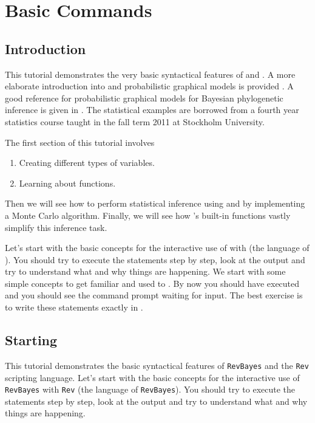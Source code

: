 \section{Basic \Rev Commands}

\subsection{Introduction}

This tutorial demonstrates the very basic syntactical features of \RevBayes and \Rev. 
A more elaborate introduction into \Rev and probabilistic graphical models is provided .
A good reference for probabilistic graphical models for Bayesian phylogenetic inference is given in \cite{Hoehna2014b}.
The statistical examples are borrowed from a fourth year statistics course taught in the fall term 2011 at Stockholm University.

The first section of this tutorial involves 
\begin{enumerate}
\item Creating different types of variables.
\item Learning about functions. 
\end{enumerate}

Then we will see how to perform statistical inference using \RevBayes and \Rev  by implementing a Monte Carlo algorithm. 
Finally, we will see how \RevBayes 's built-in functions vastly simplify this inference task.

Let's start with the basic concepts for the interactive use of \RevBayes with \Rev (the language of \RevBayes). 
You should try to execute the statements step by step, look at the output and try to understand what and why things are happening. 
We start with some simple concepts to get familiar and used to \RevBayes. 
By now you should have executed \RevBayes and you should see the command prompt waiting for input. 
The best exercise is to write these statements exactly in \RevBayes. 

\subsection{Starting \RevBayes}
This tutorial demonstrates the basic syntactical features of \texttt{RevBayes} and the \texttt{Rev} scripting language.
Let's start with the basic concepts for the interactive use of \texttt{RevBayes} with \texttt{Rev} (the language of \texttt{RevBayes}). 
You should try to execute the statements step by step, look at the output and try to understand what and why things are happening.

